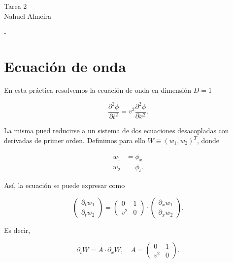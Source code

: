 \documentclass[12pt]{article}
\begin{document}

\graphicspath{{figures/}}

\begin{center}
    Tarea 2 \\
    Nahuel Almeira
\end{center}

\begin{center}
    \Large - \normalsize
\end{center}

\section{Ecuaci\'on de onda}

En esta pr\'actica resolvemos la ecuaci\'on de onda en dimensi\'on $D = 1$

\begin{equation}
\dfrac{\partial^2 \phi}{\partial t^2} = v^2 \dfrac{\partial^2 \phi}{\partial x^2}.
\end{equation}

La misma pued reducirse a un sistema de dos ecuaciones desacopladas con derivadas de primer orden. Definimos para ello $W \equiv (w_1, w_2)^T$, donde

\begin{align}
w_1 &= \phi_x \\
w_2 &= \phi_t.
\end{align}

As\'i, la ecuaci\'on se puede expresar como

\begin{equation}
\begin{pmatrix}
\partial_t w_1 \\
\partial_t w_2
\end{pmatrix} = 
\begin{pmatrix}
0 & 1 \\
v^2 & 0
\end{pmatrix} \cdot
\begin{pmatrix}
\partial_x w_1 \\
\partial_x w_2
\end{pmatrix}.
\end{equation}

Es decir,

\begin{equation} \label{eq:wave_1d_system}
\partial_t W = A \cdot \partial_x W,\quad 
A = \begin{pmatrix}
0 & 1 \\
v^2 & 0
\end{pmatrix}.
\end{equation}
\end{document}
